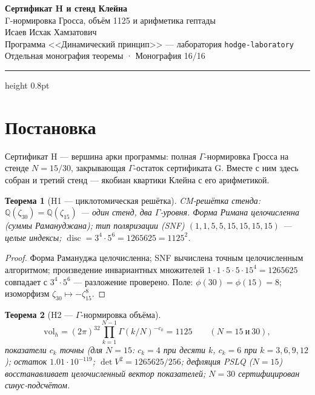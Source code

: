 \documentclass[11pt,a4paper]{article}
\theoremstyle{plain}
\newtheorem{theorem}{Теорема}
\theoremstyle{definition}
\theoremstyle{remark}
\newcommand{\QQ}{\mathbb{Q}}
\newcommand{\Ga}{\Gamma}
\newcommand{\disc}{\operatorname{disc}}
\begin{document}
\begin{center}
{\LARGE\bfseries Сертификат H и стенд Клейна}\\[0.4em]
{\large Γ-нормировка Гросса, объём 1125 и арифметика гептады}\\[0.6em]
{\normalsize Исаев Исхак Хамзатович}\\[0.2em]
{\small Программа <<Динамический принцип>> --- лаборатория \texttt{hodge-laboratory}}\\[0.15em]
{\small Отдельная монография теоремы · Монография 16/16}
\end{center}
\vspace{0.4em}
{\color{linkblue}\hrule height 0.8pt}
\vspace{0.8em}

\section{Постановка}

Сертификат H --- вершина арки программы: полная $\Ga$-нормировка
Гросса на стенде $N=15/30$, закрывающая $\Ga$-остаток сертификата G.
Вместе с ним здесь собран и третий стенд --- якобиан квартики
Клейна с его арифметикой.

\begin{theorem}[H1 --- циклотомическая решётка]\label{th:H1stand}
CM-решётка стенда: $\QQ(\zeta_{30})=\QQ(\zeta_{15})$ --- один
стенд, два $\Ga$-уровня. Форма Римана целочисленна (суммы
Рамануджана); тип поляризации (SNF) $(1,1,5,5,15,15,15,15)$ ---
целые индексы; $\disc=3^4\cdot5^6=1265625=1125^2$.
\end{theorem}

\begin{proof}
Форма Рамануджа целочисленна; SNF вычислена точным целочисленным
алгоритмом; произведение инвариантных множителей
$1\cdot1\cdot5\cdot5\cdot15^4=1265625$ совпадает с $3^4\cdot5^6$
--- разложение проверено. Поле: $\phi(30)=\phi(15)=8$;
изоморфизм $\zeta_{30}\mapsto-\zeta_{15}^8$.
\end{proof}

\begin{theorem}[H2 --- $\Ga$-нормировка объёма]\label{th:H2stand}
\[
  \mathrm{vol}_h=(2\pi)^{32}\prod_{k=1}^{N-1}\Ga(k/N)^{-c_k}=1125
  \qquad (N=15\ \text{и}\ 30),
\]
показатели $c_k$ точны (для $N=15$: $c_k=4$ при десяти $k$,
$c_k=6$ при $k=3,6,9,12$); остаток $1.01\cdot10^{-119}$;
$\det V^2=1265625/256$; дефляция PSLQ ($N=15$) восстанавливает
целочисленный вектор показателей; $N=30$ сертифицирован
синус-подсчётом.
\end{theorem}
\end{document}
